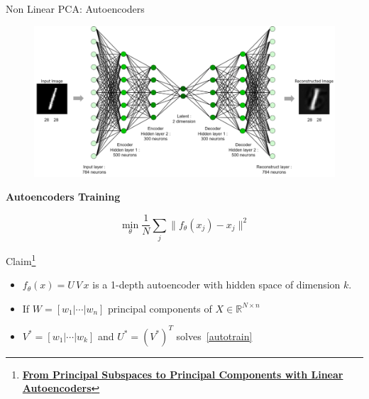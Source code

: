 \documentclass[10pt]{beamer}
\theoremstyle{definition}
\newcommand{\R}{\mathbb{R}}
\newcommand{\1}{\mathbbm{1}}
\begin{document}
\begin{frame}{Non Linear PCA: Autoencoders}
  \begin{minipage}[t]{0.5\textwidth}
      \begin{figure}[h!]
      \centering
      \includegraphics[scale=0.15, trim=0 0 0 5cm]{./pic/enc-dec.png}
    \end{figure}
  \end{minipage}%
  \begin{minipage}[t]{0.5\textwidth}
    \begin{center}
      {\bf Autoencoders Training}
    \end{center}
    \begin{equation}
      \min_\theta \frac{1}{N}\sum_{j} \|f_\theta(x_j) - x_j\|^2
      \label{autotrain}
      \tag{mP}
    \end{equation}
  \end{minipage}
  \vfill
{} 
\begin{block}{Claim\footnote{\href{https://arxiv.org/pdf/1804.10253.pdf}{\bf
      From Principal Subspaces to Principal Components with Linear
Autoencoders}}}
  \begin{itemize}
    \item $f_\theta(x)= U\,V\,x$ is a 1-depth autoencoder with hidden space of
    dimension $k$.
  \item If $W=[w_1|\cdots|w_n]$ principal components of $X\in\R^{N\times n}$
  \item $V^*= [w_1|\cdots|w_k]$ and $U^*=(V^*)^T$ solves~\ref{autotrain}
  \end{itemize}
\end{block}
\end{frame}
\appendix
\end{document}
